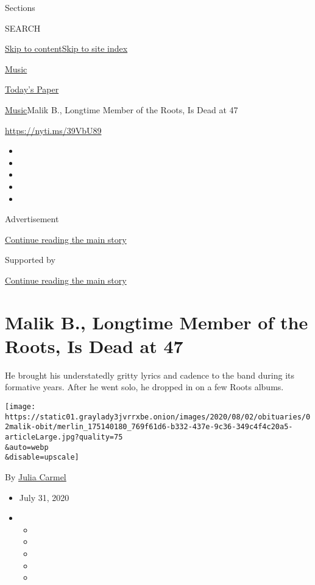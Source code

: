 Sections

SEARCH

\protect\hyperlink{site-content}{Skip to
content}\protect\hyperlink{site-index}{Skip to site index}

\href{https://www.nytimes3xbfgragh.onion/section/arts/music}{Music}

\href{https://myaccount.nytimes3xbfgragh.onion/auth/login?response_type=cookie\&client_id=vi}{}

\href{https://www.nytimes3xbfgragh.onion/section/todayspaper}{Today's
Paper}

\href{/section/arts/music}{Music}\textbar{}Malik B., Longtime Member of
the Roots, Is Dead at 47

\url{https://nyti.ms/39VbU89}

\begin{itemize}
\item
\item
\item
\item
\item
\end{itemize}

Advertisement

\protect\hyperlink{after-top}{Continue reading the main story}

Supported by

\protect\hyperlink{after-sponsor}{Continue reading the main story}

\hypertarget{malik-b-longtime-member-of-the-roots-is-dead-at-47}{%
\section{Malik B., Longtime Member of the Roots, Is Dead at
47}\label{malik-b-longtime-member-of-the-roots-is-dead-at-47}}

He brought his understatedly gritty lyrics and cadence to the band
during its formative years. After he went solo, he dropped in on a few
Roots albums.

\texttt{[image: https://static01.graylady3jvrrxbe.onion/images/2020/08/02/obituaries/02malik-obit/merlin\_175140180\_769f61d6-b332-437e-9c36-349c4f4c20a5-articleLarge.jpg?quality=75\\\&auto=webp\\\&disable=upscale]}

By \href{https://www.nytimes3xbfgragh.onion/by/julia-carmel}{Julia
Carmel}

\begin{itemize}
\item
  July 31, 2020
\item
  \begin{itemize}
  \item
  \item
  \item
  \item
  \item
  \end{itemize}
\end{itemize}

